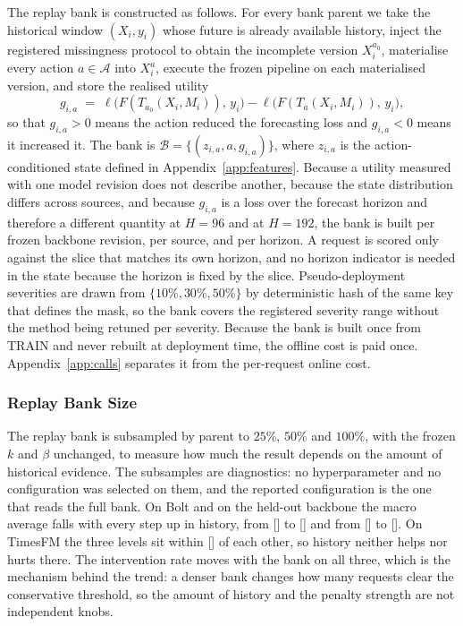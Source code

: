 \documentclass{article}
\newcommand{\ph}[1]{\textcolor{phgray}{\textsf{[\detokenize{#1}]}}}
\newcommand{\calA}{\mathcal{A}}
\newcommand{\calB}{\mathcal{B}}
\newcommand{\loss}{\ell}
\begin{document}
The replay bank is constructed as follows. For every bank parent we take the historical
window $(X_i, y_i)$ whose future is already available history, inject the registered
missingness protocol to obtain the incomplete version $X_i^{a_0}$, materialise every action
$a \in \calA$ into $X_i^{a}$, execute the frozen pipeline on each materialised version, and
store the realised utility
\begin{equation}
  g_{i,a} \;=\; \loss\big(F(T_{a_0}(X_i, M_i)),\, y_i\big) - \loss\big(F(T_{a}(X_i, M_i)),\, y_i\big),
  \label{eq:app-gain}
\end{equation}
so that $g_{i,a} > 0$ means the action reduced the forecasting loss and $g_{i,a} < 0$ means it
increased it. The bank is
$\calB = \{(z_{i,a}, a, g_{i,a})\}$, where $z_{i,a}$ is the action-conditioned state defined
in Appendix~\ref{app:features}. Because a utility measured with one model revision does not
describe another, because the state distribution differs across sources, and because $g_{i,a}$
is a loss over the forecast horizon and therefore a different quantity at $H=96$ and at
$H=192$, the bank is built per frozen backbone revision, per source, and per horizon. A request
is scored only against the slice that matches its own horizon, and no horizon indicator is
needed in the state because the horizon is fixed by the slice. Pseudo-deployment severities are drawn from
$\{10\%, 30\%, 50\%\}$ by deterministic hash of the same key that defines the mask, so the
bank covers the registered severity range without the method being retuned per severity.
Because the bank is built once from TRAIN and never rebuilt at deployment time, the offline
cost is paid once. Appendix~\ref{app:calls} separates it from the per-request online cost.

\subsubsection{Replay Bank Size}
\label{app:replaysize}
The replay bank is subsampled by parent to $25\%$, $50\%$ and $100\%$, with the frozen $k$ and
$\beta$ unchanged, to measure how much the result depends on the amount of historical evidence.
The subsamples are diagnostics: no hyperparameter and no configuration was selected on them,
and the reported configuration is the one that reads the full bank. On Bolt and on the
held-out backbone the macro average falls with every step up in history, from \ph{BANK_Q_BOLT}
to \ph{BANK_F_BOLT} and from \ph{BANK_Q_CH2} to \ph{BANK_F_CH2}. On TimesFM the three levels
sit within \ph{BANK_SPREAD_TF} of each other, so history neither helps nor hurts there. The
intervention rate moves with the bank on all three, which is the mechanism behind the trend:
a denser bank changes how many requests clear the conservative threshold, so the amount of
history and the penalty strength are not independent knobs.
\end{document}
